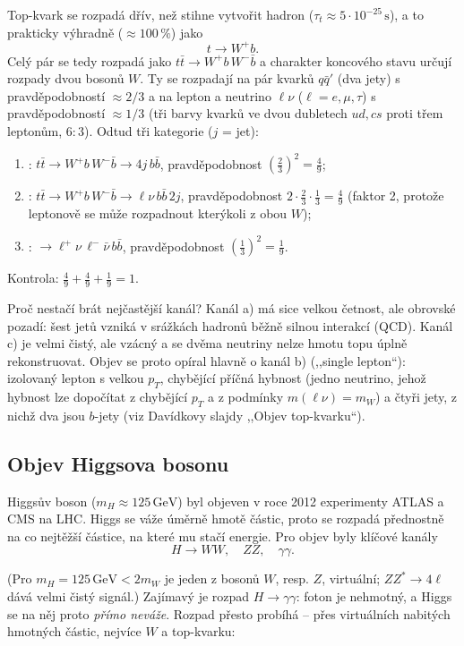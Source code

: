 Top-kvark se rozpadá dřív, než stihne vytvořit hadron (\(\tau_t\approx 5\cdot10^{-25}\,
\mathrm{s}\)), a to prakticky výhradně (\(\approx100\,\%\)) jako
\[
  t\to W^+ b .
\]
Celý pár se tedy rozpadá jako \(t\bar t\to W^+b\,W^-\bar b\) a charakter koncového stavu
určují rozpady dvou bosonů \(W\). Ty se rozpadají na pár kvarků \(q\bar q'\) (dva jety) s
pravděpodobností \(\approx 2/3\) a na lepton a neutrino \(\ell\nu\) (\(\ell=e,\mu,\tau\)) s
pravděpodobností \(\approx 1/3\) (tři barvy kvarků ve dvou dubletech \(ud,cs\) proti třem
leptonům, \(6:3\)). Odtud tři kategorie (\(j\) = jet):
\begin{enumerate}[label=\alph*)]
  \item {}: \(t\bar t\to W^+b\,W^-\bar b\to 4j\,b\bar b\), pravděpodobnost
        \(\left(\tfrac23\right)^2 = \tfrac49\);
  \item {}: \(t\bar t\to W^+b\,W^-\bar b\to \ell\nu\,b\bar b\,2j\),
        pravděpodobnost \(2\cdot\tfrac23\cdot\tfrac13 = \tfrac49\) (faktor 2, protože
        leptonově se může rozpadnout kterýkoli z obou \(W\));
  \item {}: \(\to \ell^+\nu\,\ell^-\bar\nu\,b\bar b\), pravděpodobnost
        \(\left(\tfrac13\right)^2=\tfrac19\).
\end{enumerate}
Kontrola: \(\tfrac49+\tfrac49+\tfrac19=1\).

Proč nestačí brát nejčastější kanál? Kanál a) má sice velkou četnost, ale obrovské pozadí:
šest jetů vzniká v srážkách hadronů běžně silnou interakcí (QCD). Kanál c) je velmi čistý,
ale vzácný a se dvěma neutriny nelze hmotu topu úplně rekonstruovat. Objev se proto opíral
hlavně o kanál b) (,,single lepton``): izolovaný lepton s velkou \(p_T\), chybějící
příčná hybnost (jedno neutrino, jehož hybnost lze dopočítat z chybějící \(p_T\) a z podmínky
\(m(\ell\nu)=m_W\)) a čtyři jety, z nichž dva jsou \(b\)-jety (viz Davídkovy slajdy ,,Objev
top-kvarku``).

\subsection{Objev Higgsova bosonu}

Higgsův boson (\(m_H\approx125\,\mathrm{GeV}\)) byl objeven v roce 2012 experimenty ATLAS a CMS
na LHC. Higgs se váže úměrně hmotě částic, proto se rozpadá přednostně na co nejtěžší
částice, na které mu stačí energie. Pro objev byly klíčové kanály
\[
  H\to WW,\quad ZZ,\quad \gamma\gamma .
\]

(Pro \(m_H=125\,\mathrm{GeV}<2m_W\) je jeden z bosonů \(W\), resp. \(Z\), virtuální; \(ZZ^*\to
4\ell\) dává velmi čistý signál.) Zajímavý je rozpad \(H\to\gamma\gamma\): foton je
nehmotný, a Higgs se na něj proto \emph{přímo neváže}. Rozpad přesto probíhá -- přes
 virtuálních nabitých hmotných částic, nejvíce \(W\) a top-kvarku:


